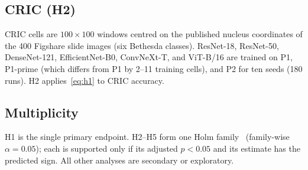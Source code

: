 \documentclass[11pt]{article}
\begin{document}
\subsection{CRIC (H2)}
\label{sec:cric}

CRIC cells are $100\times100$ windows centred on the published nucleus coordinates of
the 400 Figshare slide images (six Bethesda classes). ResNet-18, ResNet-50, DenseNet-121,
EfficientNet-B0, ConvNeXt-T, and ViT-B/16 are trained on P1, P1-prime (which differs from P1
by 2--11 training cells), and P2 for ten seeds (180 runs). H2 applies~\eqref{eq:h1} to CRIC
accuracy.

\subsection{Multiplicity}

H1 is the single primary endpoint. H2--H5 form one Holm family~\citep{holm1979}
(family-wise $\alpha=0.05$); each is supported only if its adjusted $p<0.05$ and its estimate
has the predicted sign. All other analyses are secondary or exploratory.









\appendix

\end{document}
